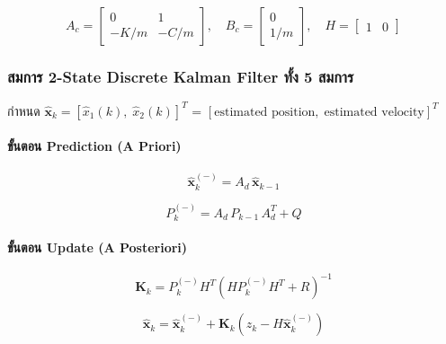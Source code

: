 \begin{equation}
    A_c = \begin{bmatrix} 0 & 1 \\ -K/m & -C/m \end{bmatrix}, \quad
    B_c = \begin{bmatrix} 0 \\ 1/m \end{bmatrix}, \quad
    H   = \begin{bmatrix} 1 & 0 \end{bmatrix}
    \label{eq:ss_matrices}
\end{equation}

\subsubsection{สมการ 2-State Discrete Kalman Filter ทั้ง 5 สมการ}

กำหนด $\hat{\mathbf{x}}_k = [\hat{x}_1(k),\; \hat{x}_2(k)]^T$
= $[\text{estimated position},\; \text{estimated velocity}]^T$

\paragraph{ขั้นตอน Prediction (A Priori)}

\begin{equation}
    \hat{\mathbf{x}}_k^{(-)} = A_d\,\hat{\mathbf{x}}_{k-1}
    \tag{2-State-1: State Prediction}
    \label{eq:kf2_predict_state}
\end{equation}

\begin{equation}
    P_k^{(-)} = A_d\,P_{k-1}\,A_d^T + Q
    \tag{2-State-2: Covariance Prediction}
    \label{eq:kf2_predict_cov}
\end{equation}

\paragraph{ขั้นตอน Update (A Posteriori)}

\begin{equation}
    \mathbf{K}_k = P_k^{(-)} H^T \!\left(H P_k^{(-)} H^T + R\right)^{-1}
    \tag{2-State-3: Kalman Gain}
    \label{eq:kf2_gain}
\end{equation}

\begin{equation}
    \hat{\mathbf{x}}_k = \hat{\mathbf{x}}_k^{(-)}
                        + \mathbf{K}_k\!\left(z_k - H\hat{\mathbf{x}}_k^{(-)}\right)
    \tag{2-State-4: State Update}
    \label{eq:kf2_update_state}
\end{equation}

